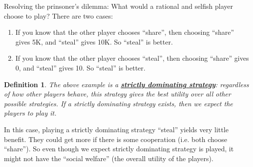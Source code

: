 \documentclass[twoside]{article}
\newtheorem{protodefinition}[prototheorem]{Definition}
\newenvironment{definition}
{\colorlet{shadecolor}{cyan!15}\begin{shaded}\begin{protodefinition}\normalfont}
		{\end{protodefinition}\end{shaded}}
\begin{document}
Resolving the prinsoner's dilemma: What would a rational and selfish player choose to play? There are two cases:  \begin{enumerate}
\item If you know that the other player chooses ``share'', then choosing ``share'' gives 5K, and ``steal'' gives 10K. So ``steal'' is better. 
\item If you know that the other player chooses ``steal'', then choosing ``share'' gives 0, and ``steal'' gives 10. So ``steal'' is better. 
\end{enumerate}
\begin{definition}
	The above example is a \textbf{\underline{strictly dominating strategy}}: regardless of how other players behave, this strategy gives the best utility over all other possible strategies. If a strictly dominating strategy exists, then we expect the players to play it. 
\end{definition}
In this case, playing a strictly dominating strategy ``steal'' yields very little benefit. They could get more if there is some cooperation (i.e. both choose ``share''). So even though we expect strictly dominating strategy is played, it might not have the ``social welfare'' (the overall utility of the players). 
\end{document}
